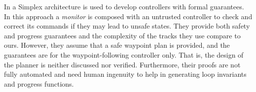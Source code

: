 In \cite{Bohrer.2019} a Simplex architecture \cite{Seto.1998} is used to develop controllers with formal guarantees.
%
In this approach a \emph{monitor} is composed with an untrusted controller to check and correct its commands if they may lead to unsafe states.
%
They provide both safety and progress guarantees and the complexity of the tracks they use compare to ours.
%
However, they assume that a safe waypoint plan is provided, and the guarantees are for the waypoint-following controller only.
%
That is, the design of the planner is neither discussed nor verified.
%
Furthermore, their proofs are not fully automated and need human ingenuity to help in generating loop invariants and progress functions.

